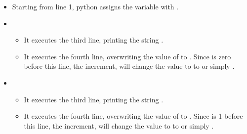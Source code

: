 \documentclass[letterpaper,10pt,english]{jupyterBook}
\begin{document}
\begin{itemize}
\item {} 
\sphinxAtStartPar
Starting from line 1, python assigns the variable  with .

\item {} 
\sphinxAtStartPar
{}
\begin{itemize}
\item {} 
\sphinxAtStartPar
It executes the third line, printing the string .

\item {} 
\sphinxAtStartPar
It executes the fourth line, overwriting the value of  to . Since  is zero before this line, the increment, will change the value to  to  or simply .

\end{itemize}

\item {} 
\sphinxAtStartPar
{}
\begin{itemize}
\item {} 
\sphinxAtStartPar
It executes the third line, printing the string .

\item {} 
\sphinxAtStartPar
It executes the fourth line, overwriting the value of  to . Since  is 1 before this line, the increment, will change the value to  to  or simply .

\end{itemize}


\end{itemize}
\end{document}
